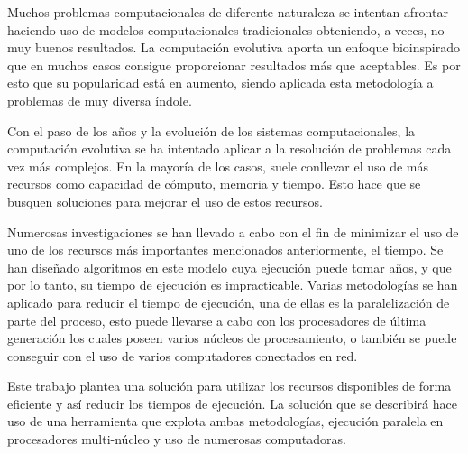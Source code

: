 Muchos problemas computacionales de diferente naturaleza se intentan afrontar haciendo uso de modelos computacionales tradicionales obteniendo, a veces, no muy buenos resultados. La computación evolutiva aporta un enfoque bioinspirado que en muchos casos consigue proporcionar resultados m\'as que aceptables. Es por esto que su popularidad est\'a en aumento, siendo aplicada esta metodolog\'ia a problemas de muy diversa \'indole.

Con el paso de los a\~nos y la evoluci\'on de los sistemas computacionales, la computaci\'on evolutiva se ha intentado aplicar a la resoluci\'on de problemas cada vez m\'as complejos. En la mayor\'ia de los casos, suele conllevar el uso de m\'as recursos como capacidad de c\'omputo, memoria y tiempo. Esto hace que se busquen soluciones para mejorar el uso de estos recursos.

Numerosas investigaciones se han llevado a cabo con el fin de minimizar el uso de uno de los recursos m\'as importantes mencionados anteriormente, el tiempo. Se han dise\~nado algoritmos en este modelo cuya ejecuci\'on puede tomar a\~nos, y que por lo tanto, su tiempo de ejecuci\'on es impracticable. Varias metodolog\'ias se han aplicado para reducir el tiempo de ejecuci\'on, una de ellas es la paralelizaci\'on de parte del proceso, esto puede llevarse a cabo con los procesadores de \'ultima generaci\'on los cuales poseen varios n\'ucleos de procesamiento, o tambi\'en se puede conseguir con el uso de varios computadores conectados en red.

Este trabajo plantea una soluci\'on para utilizar los recursos disponibles de forma eficiente y as\'i reducir los tiempos de ejecuci\'on. La soluci\'on que se describir\'a hace uso de una herramienta que explota ambas metodolog\'ias, ejecuci\'on paralela en procesadores multi-n\'ucleo y uso de numerosas computadoras.